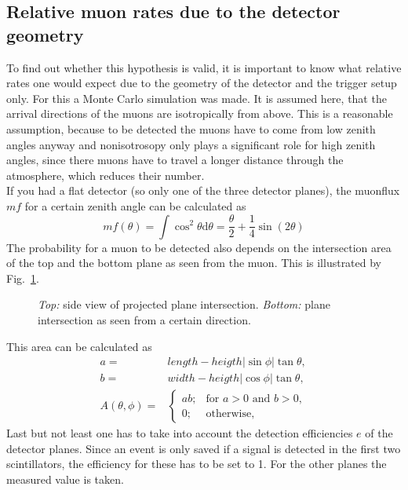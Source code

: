 
\subsection{Relative muon rates due to the detector geometry}

To find out whether this hypothesis is valid, it is important to know what relative rates one would expect due to the geometry of the detector and the trigger setup only. For this a Monte Carlo simulation was made. It is assumed here, that the arrival directions of the muons are isotropically from above. This is a reasonable assumption, because to be detected the muons have to come from low zenith angles anyway and nonisotrosopy only plays a significant role for high zenith angles, since there muons have to travel a longer distance through the atmosphere, which reduces their number. \\
If you had a flat detector (so only one of the three detector planes), the muonflux $mf$ for a certain zenith angle can be calculated as
\begin{equation}
  mf\left(\theta\right) = \int\cos^2\theta\mathrm{d}\theta = \frac{\theta}{2}+\frac{1}{4}\sin(2\theta)
\end{equation}
The probability for a muon to be detected also depends on the intersection area of the top and the bottom plane as seen from the muon. This is illustrated by Fig.~\ref{f:intersection}. 
  \begin{figure}[H]
    \centering
    

    
    \caption{\emph{Top:} side view of projected plane intersection. \emph{Bottom:} plane intersection as seen from a certain direction.}
    \label{f:intersection}
  \end{figure}
  This area can be calculated as
  \begin{align}
    a =& length - heigth\left|\sin\phi\right|\tan\theta,
  \\
    b =& width - heigth\left|\cos\phi\right|\tan\theta,
  \\
  A\left(\theta,\phi\right) =& \begin{cases}
  ab; & \text{for $a>0$ and $b>0$},
  \\
  0; & \text{otherwise},
  \end{cases}
  \end{align}
  Last but not least one has to take into account the detection efficiencies $e$ of the detector planes. Since an event is only saved if a signal is detected in the first two scintillators, the efficiency for these has to be set to 1. For the other planes the measured value is taken. 
